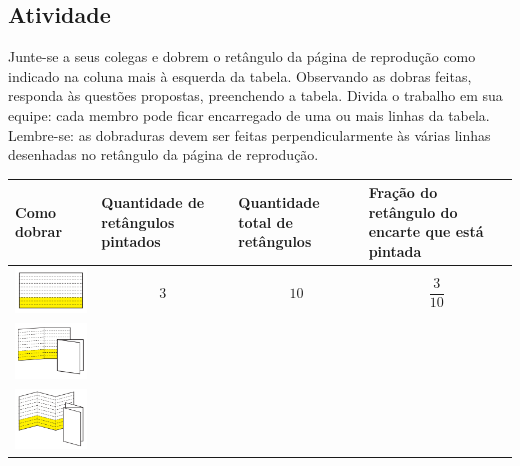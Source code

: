 \subsection{Atividade}

Junte-se a seus colegas e dobrem o retângulo da página de reprodução como indicado na coluna mais à esquerda da tabela. Observando as dobras feitas, responda às questões propostas, preenchendo a tabela. Divida o trabalho em sua equipe: cada membro pode ficar encarregado de uma ou mais linhas da tabela. Lembre-se: as dobraduras devem ser feitas perpendicularmente às várias linhas desenhadas no retângulo da página de reprodução.


  \begin{longtable}{|m{}|m{}|m{}|m{}|}
    \hline
      Como dobrar  &  Quantidade de retângulos pintados  & Quantidade total de retângulos  &  Fração do retângulo do encarte que está pintada  \\
    \hline \hline 
    \endhead
    \includegraphics[width=110pt, keepaspectratio]{../media/cap4/secoes/pngs/ativ2_fig01.png}      & $$3$$& $$10$$ & $$\dfrac{3}{10}$$   \\
    \hline
     \includegraphics[width=110pt, keepaspectratio]{../media/cap4/secoes/pngs/ativ2_fig02.png}                                                                              & &  &  \\
    \hline
     \includegraphics[width=110pt, keepaspectratio]{../media/cap4/secoes/pngs/ativ2_fig03.png}     &  &   &  \\

\end{longtable}

